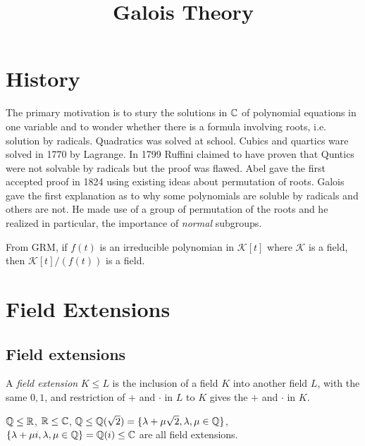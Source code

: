 \documentclass[a4paper]{article}
\begin{document}
\title{Galois Theory}

\maketitle

\newpage

\tableofcontents

\newpage

\section{History}

The primary motivation is to stury the solutions in $\mathbb{C}$ of polynomial equations in one variable and to wonder whether there is a formula involving roots, i.e. solution by radicals. Quadratics was solved at school. Cubics and quartics ware solved in 1770 by Lagrange. In 1799 Ruffini claimed to have proven that Quntics were not solvable by radicals but the proof was flawed. Abel gave the first accepted proof in 1824 using existing ideas about permutation of roots. Galois gave the first explanation as to why some polynomials are soluble by radicals and others are not. He made use of a group of permutation of the roots and he realized in particular, the importance of \emph{normal} subgroups.

From GRM, if $f(t)$ is an irreducible polynomian in $\mathcal{K}[t]$ where $\mathcal{K}$ is a field, then $\mathcal{K}[t]/(f(t))$ is a field.

\newpage

\section{Field Extensions}

\subsection{Field extensions}

\begin{defi}
A \emph{field extension} $K \leq L$ is the inclusion of a field $K$ into another field $L$, with the same $0,1$, and restriction of $+$ and $\cdot$ in $L$ to $K$ gives the $+$ and $\cdot$ in $K$.
\end{defi}

\begin{eg}
$\mathbb{Q}\leq\mathbb{R}$, $\mathbb{R}\leq\mathbb{C}$, $\mathbb{Q} \leq \mathbb{Q}(\sqrt{2}) = \{\lambda + \mu \sqrt{2}, \lambda,\mu \in \mathbb{Q}\}$, $\{\lambda+\mu i,\lambda,\mu \in \mathbb{Q}\} = \mathbb{Q}(i) \leq \mathbb{C}$ are all field extensions.
\end{eg}
\end{document}
